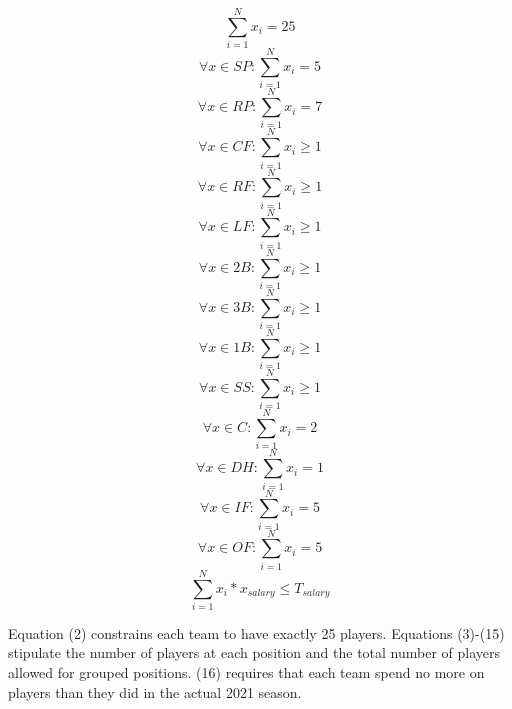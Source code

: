 \documentclass{article}
\begin{document}
\begin{equation}
\sum_{i = 1}^{N} x_{i} = 25
\end{equation}
\begin{equation}
\forall x \in SP:  \sum_{i = 1}^{N} x_{i} = 5
\end{equation}
\begin{equation}
\forall x \in RP:  \sum_{i = 1}^{N} x_{i} = 7 
\end{equation}
\begin{equation} 
\forall x \in CF:  \sum_{i = 1}^{N} x_{i} \geq 1
\end{equation}
\begin{equation} 
\forall x \in RF:  \sum_{i = 1}^{N} x_{i} \geq 1 
\end{equation}
\begin{equation} 
\forall x \in LF:  \sum_{i = 1}^{N} x_{i} \geq 1 
\end{equation}
\begin{equation} 
\forall x \in 2B:  \sum_{i = 1}^{N} x_{i} \geq 1 
\end{equation}
\begin{equation} 
\forall x \in 3B:  \sum_{i = 1}^{N} x_{i} \geq 1
\end{equation} 
\begin{equation} 
\forall x \in 1B:  \sum_{i = 1}^{N} x_{i} \geq 1 
\end{equation}
\begin{equation} 
\forall x \in SS:  \sum_{i = 1}^{N} x_{i} \geq 1 
\end{equation}
\begin{equation} 
\forall x \in C:  \sum_{i = 1}^{N} x_{i} = 2 
\end{equation}
\begin{equation}
\forall x \in DH:  \sum_{i = 1}^{N} x_{i} = 1 
\end{equation}
\begin{equation} 
\forall x \in IF:  \sum_{i = 1}^{N} x_{i} = 5 
\end{equation}
\begin{equation} 
\forall x \in OF:  \sum_{i = 1}^{N} x_{i} = 5
\end{equation}
\begin{equation}
\sum_{i = 1}^{N} x_{i} * x_{salary} \leq T_{salary}
\end{equation}

Equation (2) constrains each team to have exactly 25 players. Equations (3)-(15) stipulate the number of players at each position and the total number of players allowed for grouped positions. (16) requires that each team spend no more on players than they did in the actual 2021 season. 
\end{document}
